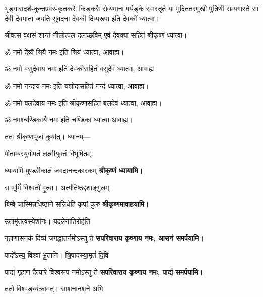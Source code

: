 \begin{center}

{भृङ्गारादर्श-कुन्तप्रवर-कृतकरैः किङ्करैः सेव्यमाना}
{पर्यङ्के स्वास्तृते या मुदिततरमुखी पुत्रिणी सम्यगास्ते}
{सा देवी देवमाता जयति सुवदना देवकी दिव्यरूपा} 
इति देवकीं ध्यात्वा।

{श्रीवत्स-वक्षसं शान्तं नीलोत्पल-दलच्छविम्}
एवं देवक्या सहितं श्रीकृष्णं ध्यात्वा।

ॐ नमो देव्यै श्रियै नमः इति श्रियं ध्यात्वा, आवाह्य।

ॐ नमो वसुदेवाय नमः इति देवकीसहितं वसुदेवं ध्यात्वा, आवाह्य।

ॐ नमो नन्दाय नमः इति यशोदासहितं नन्दं ध्यात्वा, आवाह्य।

ॐ नमो बलदेवाय नमः इति श्रीकृष्णसहितं बलदेवं ध्यात्वा, आवाह्य।

ॐ नमश्चण्डिकायै नमः इति चण्डिकां ध्यात्वा आवाह्य।

ततः श्रीकृष्णपूजां कुर्यात्। ध्यानम्—

\renewcommand{\devAya}{सपरिवाराय कृष्णाय नमः,}
\medskip

{पीताम्बरयुगोपतं लक्ष्मीयुक्तं विभूषितम्}

{ध्यायामि पुण्डरीकाक्षं जगदानन्दकारकम्}
\medskip
\textbf{श्रीकृष्णं ध्यायामि।}

{स भूमिं॑ वि॒श्वतो॑ वृ॒त्वा। अत्य॑तिष्ठद्दशाङ्गु॒लम्}

{बिम्बे चास्मिन्नधिष्ठाने सन्निधेहि कृपां कुरु}
\textbf{श्रीकृष्णमावाहयामि।}
\medskip

{उ॒तामृ॑त॒त्वस्येशा॑नः। यदन्ने॑नाति॒रोह॑ति}

{गृहाणासनकं दिव्यं जगद्धातर्नमोऽस्तु ते}
\textbf{\devAya{} आसनं समर्पयामि।}
\medskip

{पादो᳚ऽस्य॒ विश्वा॑ भू॒तानि॑। त्रि॒पाद॑स्या॒मृतं॑ दि॒वि}

{पाद्यं गृहाण दैत्यारे विश्वरूप नमोऽस्तु ते}
\textbf{\devAya{} पाद्यं समर्पयामि।}
\medskip

{ततो॒ विश्व॒ङ्व्य॑क्रामत्। सा॒श॒ना॒न॒श॒ने अ॒भि}


\end{center}
